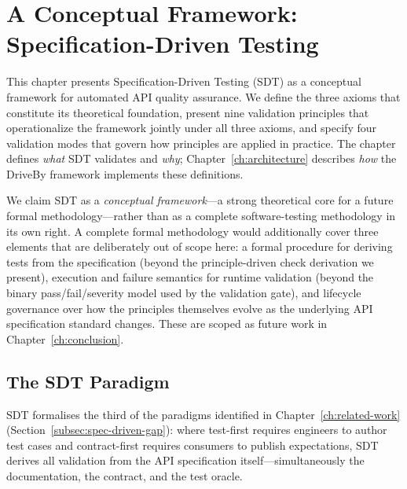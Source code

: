 \chapter{A Conceptual Framework: Specification-Driven Testing}
\label{ch:methodology}

This chapter presents Specification-Driven Testing (SDT) as a conceptual framework for automated API quality assurance. We define the three axioms that constitute its theoretical foundation, present nine validation principles that operationalize the framework jointly under all three axioms, and specify four validation modes that govern how principles are applied in practice. The chapter defines \textit{what} SDT validates and \textit{why}; Chapter~\ref{ch:architecture} describes \textit{how} the DriveBy framework implements these definitions.

We claim SDT as a \emph{conceptual framework}---a strong theoretical core for a future formal methodology---rather than as a complete software-testing methodology in its own right. A complete formal methodology would additionally cover three elements that are deliberately out of scope here: a formal procedure for deriving tests from the specification (beyond the principle-driven check derivation we present), execution and failure semantics for runtime validation (beyond the binary pass/fail/severity model used by the validation gate), and lifecycle governance over how the principles themselves evolve as the underlying API specification standard changes. These are scoped as future work in Chapter~\ref{ch:conclusion}.

\section{The SDT Paradigm}
\label{sec:ddt-paradigm}

SDT formalises the third of the paradigms identified in Chapter~\ref{ch:related-work} (Section~\ref{subsec:spec-driven-gap}): where test-first requires engineers to author test cases and contract-first requires consumers to publish expectations, SDT derives all validation from the API specification itself---simultaneously the documentation, the contract, and the test oracle.

